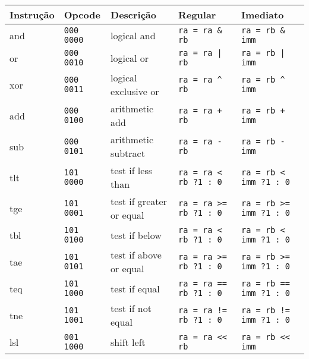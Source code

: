 \documentclass[11pt,a4paper]{report}
\begin{document}
\begin{table}[htb!]
\centering
\scriptsize
\begin{tabular}{|p{1.5cm}|p{1.5cm}|p{3.5cm}|p{3.0cm}|p{3.0cm}|}
\hline
\bf{Instrução} 	& \bf{Opcode} & \bf{Descrição} 			& \bf{Regular} 			& \bf{Imediato} \\ \hline \hline
and	&\verb|000 0000|	&logical and			&\verb|ra = ra & rb|			&\verb|ra = rb & imm|		\\ \hline
or	&\verb|000 0010|	&logical or			&\verb$ra = ra | rb$			&\verb$ra = rb | imm$		\\ \hline
xor	&\verb|000 0011|	&logical exclusive or		&\verb|ra = ra ^ rb|			&\verb|ra = rb ^ imm|		\\ \hline
add	&\verb|000 0100|	&arithmetic add			&\verb|ra = ra + rb|			&\verb|ra = rb + imm|		\\ \hline
sub	&\verb|000 0101|	&arithmetic subtract		&\verb|ra = ra - rb|			&\verb|ra = rb - imm|		\\ \hline
tlt	&\verb|101 0000|	&test if less than		&\verb|ra = ra < rb ?|\newline\verb|1 : 0|		&\verb|ra = rb < imm ?|\newline\verb|1 : 0|	\\ \hline
tge	&\verb|101 0001|	&test if greater or equal	&\verb|ra = ra >= rb ?|\newline\verb|1 : 0|		&\verb|ra = rb >= imm ?|\newline\verb|1 : 0|	\\ \hline
tbl	&\verb|101 0100|	&test if below			&\verb|ra = ra < rb ?|\newline\verb|1 : 0|		&\verb|ra = rb < imm ?|\newline\verb|1 : 0|	\\ \hline
tae	&\verb|101 0101|	&test if above or equal		&\verb|ra = ra >= rb ?|\newline\verb|1 : 0|		&\verb|ra = rb >= imm ?|\newline\verb|1 : 0|	\\ \hline
teq	&\verb|101 1000|	&test if equal			&\verb|ra = ra == rb ?|\newline\verb|1 : 0|		&\verb|ra = rb == imm ?|\newline\verb|1 : 0|	\\ \hline
tne	&\verb|101 1001|	&test if not equal		&\verb|ra = ra != rb ?|\newline\verb|1 : 0|		&\verb|ra = rb != imm ?|\newline\verb|1 : 0|	\\ \hline
lsl	&\verb|001 1000|	&shift left			&\verb|ra = ra << rb|			&\verb|ra = rb << imm|		\\ \hline

\end{tabular}
\end{table}
\end{document}
